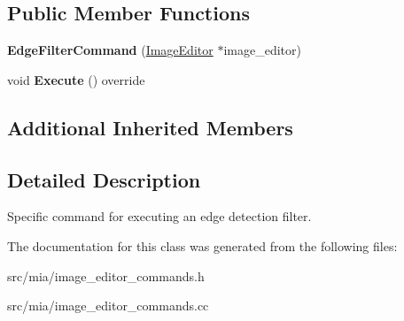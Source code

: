 \subsection*{Public Member Functions}
\begin{DoxyCompactItemize}
\item 
\mbox{\label{classimage__tools_1_1EdgeFilterCommand_ad0b9f05e02602d079c5864705465adfe}} 
{\bfseries Edge\+Filter\+Command} (\hyperlink{classimage__tools_1_1ImageEditor}{Image\+Editor} $\ast$image\+\_\+editor)
\item 
\mbox{\label{classimage__tools_1_1EdgeFilterCommand_ac2889f9d8ba5307498239d954db5e632}} 
void {\bfseries Execute} () override
\end{DoxyCompactItemize}
\subsection*{Additional Inherited Members}


\subsection{Detailed Description}
Specific command for executing an edge detection filter. 

The documentation for this class was generated from the following files\+:\begin{DoxyCompactItemize}
\item 
src/mia/image\+\_\+editor\+\_\+commands.\+h\item 
src/mia/image\+\_\+editor\+\_\+commands.\+cc\end{DoxyCompactItemize}
